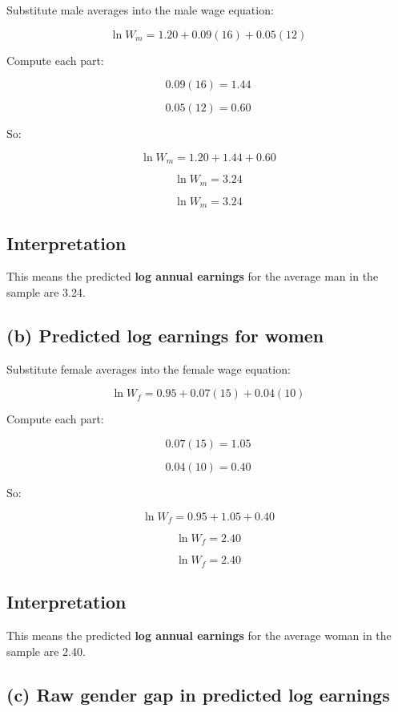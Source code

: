 \documentclass[12pt]{article}
\begin{document}
Substitute male averages into the male wage equation:

\[
\ln W_m = 1.20 + 0.09(16) + 0.05(12)
\]

Compute each part:

\[
0.09(16) = 1.44
\]

\[
0.05(12) = 0.60
\]

So:

\[
\ln W_m = 1.20 + 1.44 + 0.60
\]

\[
\ln W_m = 3.24
\]

\[
\boxed{\ln W_m = 3.24}
\]

\subsection*{Interpretation}

This means the predicted \textbf{log annual earnings} for the average man in the sample are 3.24.

\vspace{0.8em}

\subsection*{(b) Predicted log earnings for women}

Substitute female averages into the female wage equation:

\[
\ln W_f = 0.95 + 0.07(15) + 0.04(10)
\]

Compute each part:

\[
0.07(15) = 1.05
\]

\[
0.04(10) = 0.40
\]

So:

\[
\ln W_f = 0.95 + 1.05 + 0.40
\]

\[
\ln W_f = 2.40
\]

\[
\boxed{\ln W_f = 2.40}
\]

\subsection*{Interpretation}

This means the predicted \textbf{log annual earnings} for the average woman in the sample are 2.40.

\vspace{0.8em}

\subsection*{(c) Raw gender gap in predicted log earnings}
\end{document}
